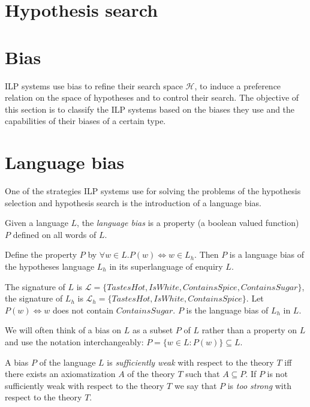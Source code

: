 \section{Hypothesis search}

\section{Bias}
ILP systems use bias to refine their search space $\mathcal{H}$, to induce a preference relation on the space of hypotheses and to control their search. The objective of this section is to classify the ILP systems based on the biases they use and the capabilities of their biases of a certain type.


\section{Language bias}
One of the strategies ILP systems use for solving the problems of the hypothesis selection and hypothesis search is the introduction of a language bias.

\begin{defn}
Given a language $L$, the \emph{language bias} is a property (a boolean valued function) $P$ defined on all words of $L$.
\end{defn}

\begin{exmp}
Define the property $P$ by $\forall w \in L. P(w) \iff w \in L_h$. Then $P$ is a language bias of the hypotheses language $L_h$ in its superlanguage of enquiry $L$.
\end{exmp}

\begin{exmp}
The signature of $L$ is
$\mathcal{L}=\{TastesHot, IsWhite, ContainsSpice, ContainsSugar\}$,
the signature of $L_h$ is
$\mathcal{L}_h=\{TastesHot, IsWhite, ContainsSpice\}$.
Let $P(w) \iff w$ does not contain $ContainsSugar$. $P$ is the language bias of $L_h$ in $L$.
\end{exmp}

\begin{remark}
We will often think of a bias on $L$ as a subset $P$ of $L$ rather than a property on $L$ and use the notation interchangeably:
$P=\{w \in L : P(w)\} \subseteq L$.
\end{remark}

\begin{defn}
A bias $P$ of the language $L$ is \emph{sufficiently weak} with respect to the theory $T$ iff there exists an axiomatization $A$ of the theory $T$ such that $A \subseteq P$. If $P$ is not sufficiently weak with respect to the theory $T$ we say that $P$ is \emph{too strong} with respect to the theory $T$.
\end{defn}

